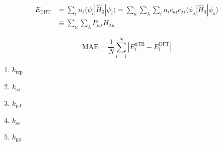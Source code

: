 \documentclass{article}
\begin{document}
\begin{equation*}
    \begin{aligned}
        E_{\text{EHT}} & = \sum_{i} n_i \langle \psi_i | \hat{H}_0 | \psi_i \rangle
        = \sum_{\kappa} \sum_{\lambda} \sum_{i} n_i c_{\kappa i} c_{\lambda i}
        \langle \phi_{\lambda} | \hat{H}_0 | \phi_{\kappa} \rangle                                 \\
                       & \equiv \sum_{\kappa} \sum_{\lambda} P_{\kappa \lambda} H_{\lambda \kappa}
    \end{aligned}
\end{equation*}

\begin{equation*}
    \text{MAE} = \frac{1}{N} \sum_{i=1}^{N} \left| E_i^{\text{xTB}} - E_i^{\text{DFT}} \right|
\end{equation*}

\begin{enumerate}
    \item $k_{\text{rep}}$
    \item $k_{\text{sd}}$
    \item $k_{\text{pd}}$
    \item $k_{\text{ss}}$
    \item $k_{\text{pp}}$
\end{enumerate}
\end{document}
